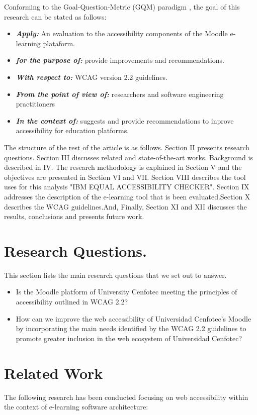 \documentclass{IEEEtran}
\begin{document}
Conforming to the Goal-Question-Metric (GQM) paradigm \cite{Basili1992}, the goal of this research can be stated as follows:

\begin{itemize}
\item[] {\textbf{\textit{Apply:}}} An evaluation to the accessibility components of the Moodle e-learning plataform.
\item[] {\textbf{\textit{for the purpose of:}}} provide improvements and recommendations.
\item[] {\textbf{\textit{With respect to:}}} WCAG version 2.2 guidelines.
\item[] {\textbf{\textit{From the point of view of:}}} researchers and software engineering practitioners
\item[] {\textbf{\textit{In the context of:}}} suggests and provide recommendations to inprove accessibility for education platforms.
\end{itemize}

\vspace{1cm}
The structure of the rest of the article is as follows. Section
II presents research questions. Section III discusses related
and state-of-the-art works. Background is described
in IV. The research methodology is explained in Section V and
the objectives are presented in Section VI and VII. Section
VIII describes the tool uses for this analysis "IBM EQUAL ACCESSIBILITY CHECKER". Section IX addresses
the description of the e-learning tool that is been evaluated.Section X describes the WCAG guidelines.And, Finally, Section XI and XII discusses the results, conclusions
and presents future work.


\section{Research Questions.}
This section lists the main research questions that we set out to answer.
\begin{itemize}
    \item Is the Moodle platform of University Cenfotec meeting the principles of accessibility outlined in WCAG 2.2?
    \item How can we improve the web accessibility of Universidad Cenfotec's Moodle by incorporating the main needs identified by the WCAG 2.2 guidelines to promote greater inclusion in the web ecosystem of Universidad Cenfotec?
\end{itemize}


\section{Related Work}
The following research has been conducted focusing on web accessibility within the context of e-learning software architecture:
\end{document}
